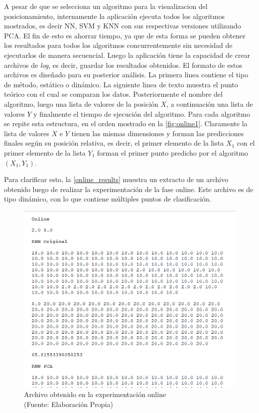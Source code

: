 A pesar de que se selecciona un algoritmo para la visualizacion del posicionamiento, internamente la aplicación ejecuta todos los algoritmos mostrados, es decir NN, SVM y KNN con sus respectivas versiones utilizando PCA. El fin de esto es ahorrar tiempo, ya que de esta forma se pueden obtener los resultados para todos los algoritmos concurrentemente sin necesidad de ejecutarlos de manera secuencial. Luego la aplicación tiene la capacidad de crear archivos de \textit{log}, es decir, guardar los resultados obtenidos. El formato de estos archivos es diseñado para su posterior análisis. La primera linea contiene el tipo de método, estático o dinámico. La siguiente linea de texto muestra el punto teórico con el cual se comparan los datos. Posteriormente el nombre del algoritmo, luego una lista de valores de la posición $X$, a continuación una lista de valores $Y$ y finalmente el tiempo de ejecución del algoritmo. Para cada algoritmo se repite esta estructura, en el orden mostrado en la \autoref{fig:online1}. Claramente la lista de valores $X$ e $Y$ tienen las mismas dimensiones y forman las predicciones finales según su posición relativa, es decir, el primer elemento de la lista $X_{1}$ con el primer elemento de la lista $Y_{1}$ forman el primer punto predicho por el algoritmo $(X_{1}, Y_{1})$. 

Para clarificar esto, la \autoref{online_results} muestra un extracto de un archivo obtenido luego de realizar la experimentación de la fase online. Este archivo es de tipo dinámico, con lo que contiene múltiples puntos de clasificación.

\begin{figure}[ht!]
\centering
\includegraphics[width=.6\textwidth]{figures/online-results.png}
\caption[abs]{Archivo obtenido en la experimentación online  \\
{\scriptsize (Fuente: Elaboración Propia)}}
\label{fig:online_results}
\end{figure}


